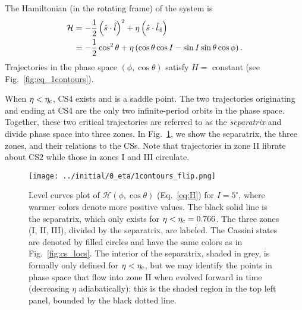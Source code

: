 \documentclass[
        fleqn,
        usenatbib,
        referee,
    ]{mnras}
\newcommand*{\p}[1]{\left(#1\right)}
\begin{document}
The Hamiltonian (in the rotating frame) of the system is
\begin{align}
    \mathcal{H} &= -\frac{1}{2}\p{\hat{s} \cdot \hat{l}}^2
            + \eta \p{\hat{s} \cdot \hat{l}_{\rm d}}\label{eq:H}\nonumber\\
        &= -\frac{1}{2}\cos^2\theta
            + \eta \p{\cos \theta \cos I - \sin I \sin \theta \cos \phi}.
\end{align}
Trajectories in the phase space $\p{\phi, \cos \theta}$ satisfy $H = $ constant
(see Fig.~\autoref{fig:eq_1contours}).

When $\eta < \eta_{\rm c}$, CS4 exists and is a saddle point. The two
trajectories originating and ending at CS4 are the only two infinite-period
orbits in the phase space. Together, these two critical trajectories are
referred to as the \emph{separatrix} and divide phase space into three zones. In
Fig.~\ref{fig:eq_1contours}, we show the separatrix, the three zones, and their
relations to the CSs. Note that trajectories in zone II librate about CS2
while those in zones I and III circulate.
\begin{figure*}
    \centering
    \texttt{[image: ../initial/0\_eta/1contours\_flip.png]}
    \caption{Level curves plot of $\mathcal{H}\p{\phi, \cos \theta}$
    (Eq.~\eqref{eq:H}) for $I = 5^\circ$, where warmer colors denote more
    positive values. The black solid line is the separatrix, which only exists
    for $\eta < \eta_{\rm c} = 0.766$. The three zones (I, II, III), divided by
    the separatrix, are labeled. The Cassini states are denoted by filled
    circles and have the same colors as in Fig.~\ref{fig:cs_locs}. The interior
    of the separatrix, shaded in grey, is formally only defined for $\eta <
    \eta_{\rm c}$, but we may identify the points in phase space that flow into
    zone II when evolved forward in time (decreasing $\eta$ adiabatically); this
    is the shaded region in the top left panel, bounded by the black dotted
    line.}\label{fig:eq_1contours}
\end{figure*}
\end{document}
